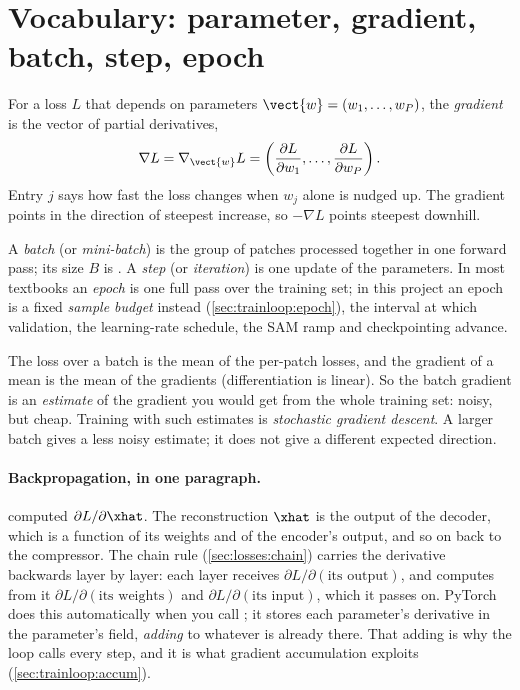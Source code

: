 \section{Vocabulary: parameter, gradient, batch, step, epoch}\label{sec:trainloop:vocab}

\begin{definition}[Gradient]
For a loss $L$ that depends on parameters $\vect{w} = (w_1, \dots, w_P)$, the \emph{gradient}
is the vector of partial derivatives,
\[
\nabla L = \nabla_{\vect{w}} L = \left(\frac{\partial L}{\partial w_1}, \dots, \frac{\partial L}{\partial w_P}\right).
\]
Entry $j$ says how fast the loss changes when $w_j$ alone is nudged up. The gradient points in
the direction of steepest increase, so $-\nabla L$ points steepest downhill.
\end{definition}

\begin{definition}
A \emph{batch} (or \emph{mini-batch}) is the group of patches processed together in one forward
pass; its size $B$ is . A \emph{step} (or \emph{iteration}) is one update of
the parameters. In most textbooks an \emph{epoch} is one full pass over the training set; in
this project an epoch is a fixed \emph{sample budget} instead (\cref{sec:trainloop:epoch}),
the interval at which validation, the learning-rate schedule, the SAM ramp and checkpointing
advance.
\end{definition}

The loss over a batch is the mean of the per-patch losses, and the gradient of a mean is the
mean of the gradients (differentiation is linear). So the batch gradient is an
\emph{estimate} of the gradient you would get from the whole training set: noisy, but cheap.
Training with such estimates is \emph{stochastic gradient descent}. A larger batch gives a less noisy estimate; it does not give a different
expected direction.

\paragraph{Backpropagation, in one paragraph.}  computed $\partial L/\partial\xhat$.
The reconstruction $\xhat$ is the output of the decoder, which is a function of its weights and
of the encoder's output, and so on back to the compressor. The chain rule
(\cref{sec:losses:chain}) carries the derivative backwards layer by layer: each layer receives
$\partial L/\partial(\text{its output})$, and computes from it $\partial L/\partial(\text{its
weights})$ and $\partial L/\partial(\text{its input})$, which it passes on. PyTorch does this
automatically when you call ; it stores each parameter's derivative in the
parameter's  field, \emph{adding} to whatever is already there. That adding is
why the loop calls  every step, and it is what gradient
accumulation exploits (\cref{sec:trainloop:accum}).

